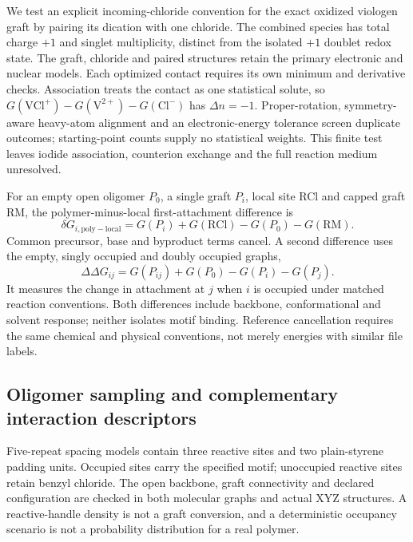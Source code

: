 \documentclass[11pt]{article}
\begin{document}
We test an explicit incoming-chloride convention for the exact oxidized viologen graft by pairing its dication with one chloride. The combined species has total charge $+1$ and singlet multiplicity, distinct from the isolated $+1$ doublet redox state. The graft, chloride and paired structures retain the primary electronic and nuclear models. Each optimized contact requires its own minimum and derivative checks. Association treats the contact as one statistical solute, so $G(\mathrm{VCl}^{+})-G(\mathrm{V}^{2+})-G(\mathrm{Cl}^{-})$ has $\Delta n=-1$. Proper-rotation, symmetry-aware heavy-atom alignment and an electronic-energy tolerance screen duplicate outcomes; starting-point counts supply no statistical weights. This finite test leaves iodide association, counterion exchange and the full reaction medium unresolved.

For an empty open oligomer $P_0$, a single graft $P_i$, local site RCl and capped graft RM, the polymer-minus-local first-attachment difference is
\begin{equation}
\delta G_{i,\mathrm{poly-local}}=G(P_i)+G(\mathrm{RCl})-G(P_0)-G(\mathrm{RM}).
\label{eq:polylocal}
\end{equation}
Common precursor, base and byproduct terms cancel. A second difference uses the empty, singly occupied and doubly occupied graphs,
\begin{equation}
\Delta\Delta G_{ij}=G(P_{ij})+G(P_0)-G(P_i)-G(P_j).
\label{eq:nonadditivity}
\end{equation}
It measures the change in attachment at $j$ when $i$ is occupied under matched reaction conventions. Both differences include backbone, conformational and solvent response; neither isolates motif binding. Reference cancellation requires the same chemical and physical conventions, not merely energies with similar file labels.

\subsection{Oligomer sampling and complementary interaction descriptors}
Five-repeat spacing models contain three reactive sites and two plain-styrene padding units. Occupied sites carry the specified motif; unoccupied reactive sites retain benzyl chloride. The open backbone, graft connectivity and declared configuration are checked in both molecular graphs and actual XYZ structures. A reactive-handle density is not a graft conversion, and a deterministic occupancy scenario is not a probability distribution for a real polymer.
\end{document}
